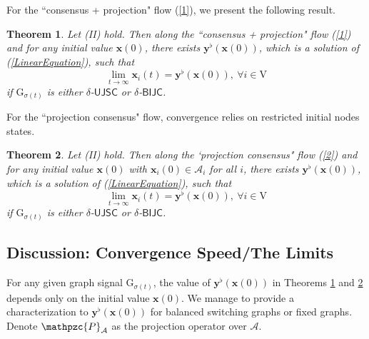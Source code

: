 \documentclass[a4paper, 11pt]{article}
\newtheorem{theorem}{Theorem}
\begin{document}
For the ``consensus + projection" flow (\ref{1}), we present the following result.


\begin{theorem}\label{thm3}
Let (II) hold. Then   along  the ``consensus + projection" flow (\ref{1}) and for any initial value $\mathbf{x}(0)$, there exists  $\mathbf{y}^\flat(\mathbf{x}(0))$, which is a solution of (\ref{LinearEquation}), such that   $$
\lim_{t\to \infty} \mathbf{x}_i(t)=\mathbf{y}^\flat(\mathbf{x}(0)),\  \forall i\in\mathrm{V}
$$ if $\mathrm{G}_{\sigma(t)}$ is either  $\delta$-$\mathsf{UJSC}$ or $\delta$-$\mathsf{BIJC}$.
\end{theorem}


For the ``projection consensus" flow, convergence relies on restricted initial nodes states.
\begin{theorem}\label{thm4}
Let (II) hold. Then   along  the `projection consensus" flow  (\ref{2}) and for any initial value $\mathbf{x}(0)$ with $\mathbf{x}_i(0)\in \mathcal{A}_i$ for all $i$, there exists  $\mathbf{y}^\flat(\mathbf{x}(0))$, which is a solution of (\ref{LinearEquation}), such that   $$
\lim_{t\to \infty} \mathbf{x}_i(t)=\mathbf{y}^\flat(\mathbf{x}(0)),\  \forall i\in\mathrm{V}
$$ if $\mathrm{G}_{\sigma(t)}$ is either  $\delta$-$\mathsf{UJSC}$ or $\delta$-$\mathsf{BIJC}$.
\end{theorem}

\subsection{Discussion: Convergence Speed/The Limits}


For any given graph signal $\mathrm{G}_{\sigma(t)}$, the value of $\mathbf{y}^\flat(\mathbf{x}(0))$ in Theorems \ref{thm3} and \ref{thm4}  depends only on the initial value $\mathbf{x}(0)$. We manage to provide a characterization to  $\mathbf{y}^\flat(\mathbf{x}(0))$ for balanced switching graphs or fixed graphs. Denote $\mathpzc{P}_{\mathcal{A}}$ as the projection operator over $\mathcal{A}$.
\end{document}
